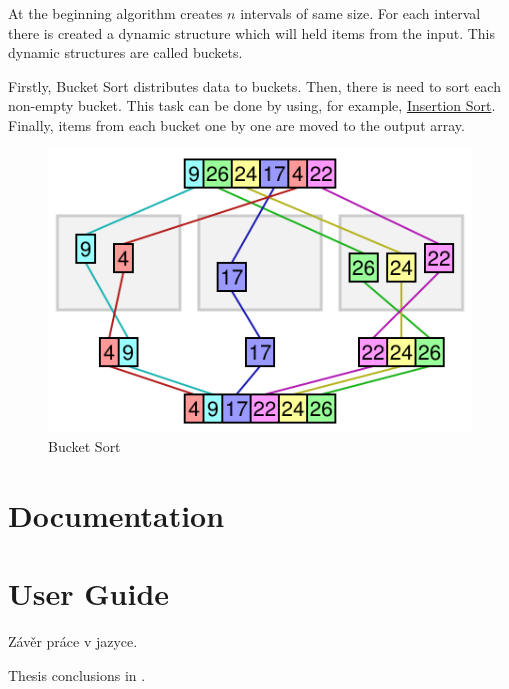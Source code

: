 \documentclass[
  field=inf,
  biblatex,
  language=english,
  glossaries,
  index
]{kidiplom}
\begin{document}
At the beginning algorithm creates $n$ intervals of same size. For each interval there is created a dynamic structure which will held items from the input. This dynamic structures are called buckets.

Firstly, Bucket Sort distributes data to buckets. Then, there is need to sort each non-empty bucket. This task can be done by using, for example, \hyperref[sec:insertion]{Insertion Sort}. Finally, items from each bucket one by one are moved to the output array.

\begin{figure}[H]
\begin{center}
	
	\includegraphics[scale=0.5]{img/Bucketsort.png}
	\caption{Bucket Sort}\label{fig:radixsort}
\end{center}
\end{figure}

\section{Documentation}

\section{User Guide}

\begin{kiconclusions}
Závěr práce v  jazyce.
\end{kiconclusions}

\begin{kiconclusions}[english]
Thesis conclusions in .
\end{kiconclusions}
\end{document}
